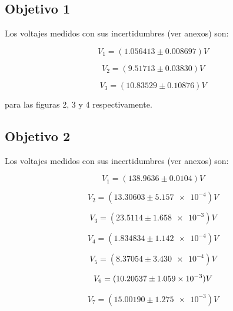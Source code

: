 \documentclass[DIV=calc, paper=a4, fontsize=11pt]{scrartcl}
\begin{document}
\begin{multicols}{2}
\subsection*{Objetivo 1}

Los voltajes medidos con sus incertidumbres (ver anexos) son:

\begin{equation*}
    V_1 = (1.056413 \pm 0.008697) V 
\end{equation*}

\begin{equation*}
    V_2 = (9.51713 \pm 0.03830) V
\end{equation*}

\begin{equation*}
    V_3 = (10.83529 \pm 0.10876) V
\end{equation*}

\noindent para las figuras 2, 3 y 4 respectivamente. 



\subsection*{Objetivo 2}

Los voltajes medidos con sus incertidumbres (ver anexos) son:

\begin{equation*}
    V_1 = (138.9636 \pm 0.0104) V
\end{equation*}

\begin{equation*}
    V_2 = (13.30603 \pm \num{5.157e-4}) V
\end{equation*}

\begin{equation*}
    V_3 = (23.5114 \pm \num{1.658e-3}) V
\end{equation*}

\begin{equation*}
    V_4 = (1.834834 \pm \num{1.142e-4}) V
\end{equation*}

\begin{equation*}
    V_5 = (8.37054 \pm \num{3.430e-4}) V
\end{equation*}

\begin{equation*}
    V_6 = (10.20537 \pm \num{1.059 e -3}) V
\end{equation*}

\begin{equation*}
    V_7 = (15.00190 \pm \num{1.275e-3}) V
\end{equation*}


\end{multicols}
\end{document}
